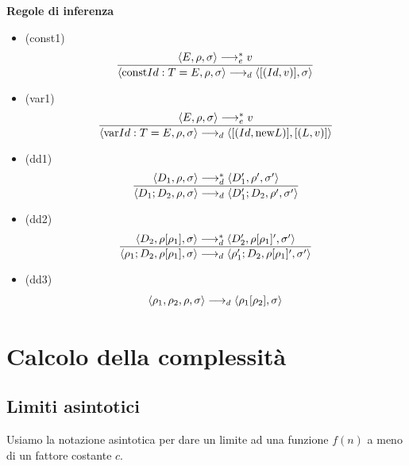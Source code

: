 \documentclass{article}
\begin{document}
\noindent\textbf{Regole di inferenza}
\begin{itemize}
    \item (const1)
          \[\frac
              {\langle E,\rho,\sigma \rangle \longrightarrow^*_e v}
              {\langle \text{const} Id: T = E,\rho,\sigma \rangle \longrightarrow_d \langle [(Id,v)],\sigma \rangle}\]

    \item (var1)
          \[\frac
              {\langle E,\rho,\sigma \rangle \longrightarrow^*_e v}
              {\langle \text{var} Id: T = E,\rho,\sigma \rangle \longrightarrow_d \langle [(Id,\text{new} L)],[(L,v)] \rangle}\]

    \item (dd1)
          \[\frac
              {\langle D_1,\rho,\sigma \rangle \longrightarrow^*_d \langle D_1',\rho',\sigma' \rangle}
              {\langle D_1;D_2,\rho,\sigma \rangle \longrightarrow_d \langle D_1';D_2,\rho',\sigma' \rangle}\]

    \item (dd2)
          \[\frac
              {\langle D_2,\rho[\rho_1],\sigma \rangle \longrightarrow^*_d \langle D_2',\rho[\rho_1]',\sigma' \rangle}
              {\langle \rho_1;D_2,\rho[\rho_1],\sigma \rangle \longrightarrow_d \langle \rho_1';D_2,\rho[\rho_1]',\sigma' \rangle}\]

    \item (dd3)
          \[\langle \rho_1,\rho_2,\rho,\sigma \rangle \longrightarrow_d \langle \rho_1[\rho_2], \sigma \rangle\]
\end{itemize}

\pagebreak

\section{Calcolo della complessità}
\subsection{Limiti asintotici}
Usiamo la notazione asintotica per dare un limite ad una funzione \(f(n)\) a meno di un fattore costante \(c\).
\end{document}
